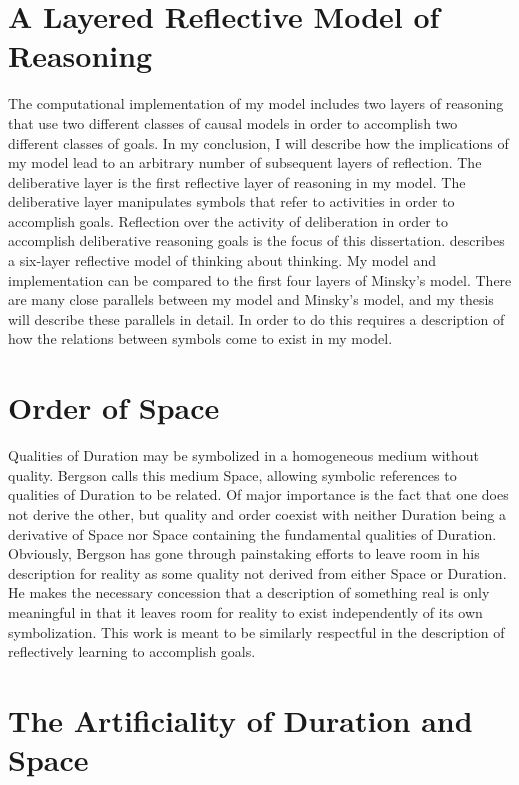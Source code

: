 \section{A Layered Reflective Model of Reasoning}

The computational implementation of my model includes two layers of
reasoning that use two different classes of causal models in order to
accomplish two different classes of goals.  In my conclusion, I will
describe how the implications of my model lead to an arbitrary number
of subsequent layers of reflection.  The deliberative layer is the
first reflective layer of reasoning in my model.  The deliberative
layer manipulates symbols that refer to activities in order to
accomplish goals.  Reflection over the activity of deliberation in
order to accomplish deliberative reasoning goals is the focus of this
dissertation.  \cite{minsky:2006} describes a six-layer reflective
model of thinking about thinking.  My model and implementation can be
compared to the first four layers of Minsky's model.  There are many
close parallels between my model and Minsky's model, and my thesis
will describe these parallels in detail.  In order to do this requires
a description of how the relations between symbols come to exist in my
model.

\section{Order of Space}

Qualities of Duration may be symbolized in a homogeneous medium
without quality.  Bergson calls this medium Space, allowing symbolic
references to qualities of Duration to be related.  Of major
importance is the fact that one does not derive the other, but quality
and order coexist with neither Duration being a derivative of Space
nor Space containing the fundamental qualities of Duration.
Obviously, Bergson has gone through painstaking efforts to leave room
in his description for reality as some quality not derived from either
Space or Duration.  He makes the necessary concession that a
description of something real is only meaningful in that it leaves
room for reality to exist independently of its own symbolization.
This work is meant to be similarly respectful in the description of
reflectively learning to accomplish goals.

\section{The Artificiality of Duration and Space}
\label{section:the_artificiality_of_duration_and_space}

